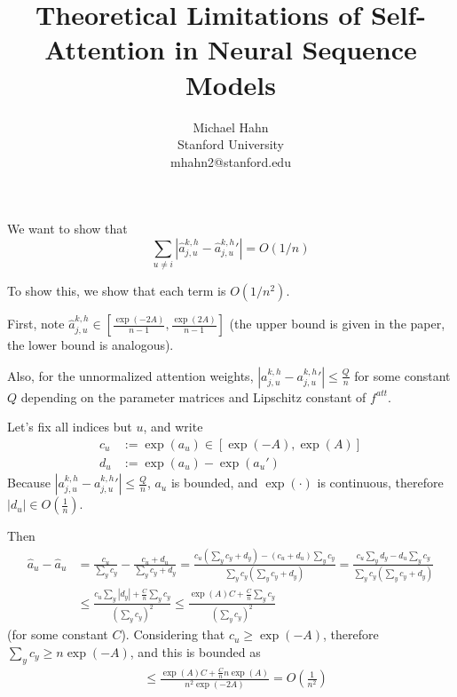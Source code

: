 \documentclass[11pt,a4paper]{article}
\title{Theoretical Limitations of Self-Attention in Neural Sequence Models}
\author{Michael Hahn \\ Stanford University \\ {\sf mhahn2@stanford.edu}}
\begin{document}
We want to show that
\begin{equation}
    \sum_{u\neq i} |\hat{a}_{j,u}^{k,h} - \hat{a}_{j,u}^{k,h}'| = O(1/n)
\end{equation}

To show this, we show that each term is $O(1/n^2)$.

First, note $\hat{a}_{j,u}^{k,h} \in [\frac{\exp(-2A)}{n-1}, \frac{\exp(2A)}{n-1}]$ (the upper bound is given in the paper, the lower bound is analogous).

Also, for the unnormalized attention weights, $|a_{j,u}^{k,h} - a_{j,u}^{k,h}'| \leq \frac{Q}{n}$ for some constant $Q$ depending on the parameter matrices and Lipschitz constant of $f^{att}$.

Let's fix all indices but $u$, and write
\begin{align}
c_u &:= \exp(a_u) \in [\exp(-A), \exp(A)] \\
d_u &:= \exp(a_u) - \exp(a_u') 
\end{align}
Because $|a_{j,u}^{k,h} - a_{j,u}^{k,h}'| \leq \frac{Q}{n}$, $a_u$ is bounded, and $\exp(\cdot)$ is continuous, therefore $|d_u| \in O(\frac{1}{n})$.



Then
\begin{align}
\hat{a}_u - \hat{a}_u &= \frac{c_u}{\sum_y c_y} - \frac{c_u+d_u}{\sum_y c_y+d_y} = \frac{c_u (\sum_y c_y+d_y) - (c_u+d_u) \sum_y c_y }{\sum_y c_y (\sum_y c_y+d_y)} = \frac{c_u \sum_y d_y - d_u \sum_y c_y }{\sum_y c_y (\sum_y c_y+d_y)} \\
&\leq \frac{c_u \sum_y |d_y| + \frac{C}{n} \sum_y c_y }{(\sum_y c_y)^2} \leq \frac{\exp(A) C + \frac{C}{n} \sum_y c_y }{(\sum_y c_y)^2}
\end{align}
(for some constant $C$).
Considering that $c_u \geq \exp(-A)$, therefore $\sum_y c_y \geq n\exp(-A)$, and this is bounded as
\begin{align}
&\leq  \frac{\exp(A) C + \frac{C}{n} n\exp(A) }{n^2\exp(-2A)} = O(\frac{1}{n^2})
\end{align}
\end{document}
